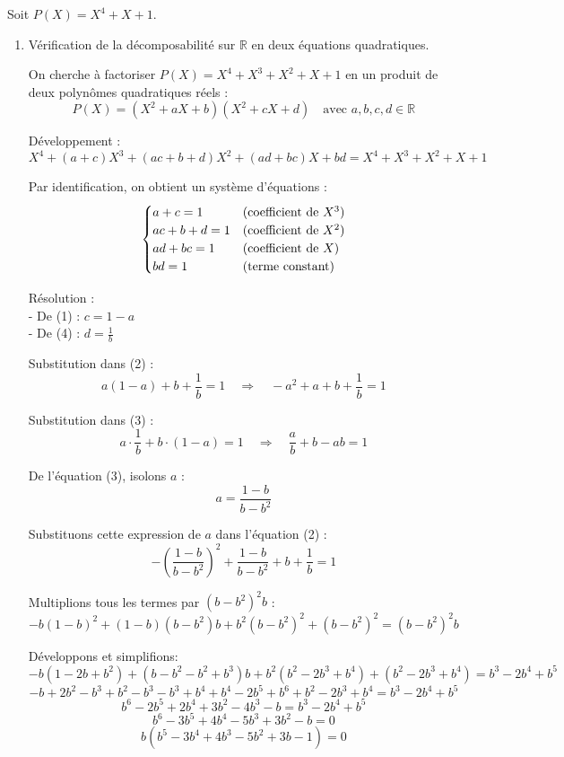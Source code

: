 \documentclass[10pt,a4paper]{article}
\begin{document}

\q Soit \( P(X) = X^4 + X + 1 \).

\begin{enumerate}
    \item Vérification de la décomposabilité sur \( \mathbb{R} \) en deux équations quadratiques.

   On cherche à factoriser $ P(X) = X^4 + X^3 + X^2 + X + 1 $ en un produit de deux polynômes
   quadratiques réels :
   $$
   P(X) = (X^2 + aX + b)(X^2 + cX + d) \quad \text{avec } a, b, c, d \in \mathbb{R}
   $$

   Développement :
   $$
   X^4 + (a + c)X^3 + (ac + b + d)X^2 + (ad + bc)X + bd = X^4 + X^3 + X^2 + X + 1
   $$

   Par identification, on obtient un système d'équations :
   $$\begin{cases}
      a + c = 1 & \text{(coefficient de \( X^3 \))} \\
      ac + b + d = 1 & \text{(coefficient de \( X^2 \))} \\
      ad + bc = 1 & \text{(coefficient de \( X \))} \\
      bd = 1 & \text{(terme constant)}
   \end{cases}$$

   Résolution :\\
   - De (1) : $ c = 1 - a $\\
   - De (4) : $ d = \frac{1}{b} $

   Substitution dans (2) :
   $$
   a(1 - a) + b + \frac{1}{b} = 1 \quad \Rightarrow \quad -a^2 + a + b + \frac{1}{b} = 1
   $$

   Substitution dans (3) :
   $$
   a \cdot \frac{1}{b} + b \cdot (1 - a) = 1 \quad \Rightarrow \quad \frac{a}{b} + b - ab = 1
   $$

   De l'équation (3), isolons $a$ :
   $$a = \frac{1-b}{b-b^2}$$

   Substituons cette expression de $a$ dans l'équation (2) :
   $$-\left(\frac{1-b}{b-b^2}\right)^2 + \frac{1-b}{b-b^2} + b + \frac{1}{b} = 1$$

   Multiplions tous les termes par $(b-b^2)^2b$ :
   $$-b(1-b)^2 + (1-b)(b-b^2)b + b^2(b-b^2)^2 + (b-b^2)^2 = (b-b^2)^2b$$

   Développons et simplifions:
      $$-b(1-2b+b^2) + (b-b^2-b^2+b^3)b + b^2(b^2-2b^3+b^4) + (b^2-2b^3+b^4) = b^3-2b^4+b^5$$
      $$-b+2b^2-b^3 + b^2-b^3-b^3+b^4 + b^4-2b^5+b^6 + b^2-2b^3+b^4 = b^3-2b^4+b^5$$
      $$b^6 - 2b^5 + 2b^4 + 3b^2 - 4b^3 - b = b^3 - 2b^4 + b^5$$
      $$b^6 - 3b^5 + 4b^4 - 5b^3 + 3b^2 - b = 0$$
      $$b(b^5 - 3b^4 + 4b^3 - 5b^2 + 3b - 1) = 0$$


\end{enumerate}
\end{document}
